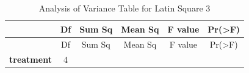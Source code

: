 \documentclass[]{article}
\begin{document}
\begin{longtable}[]{@{}cccccc@{}}
\caption{Analysis of Variance Table for Latin Square 3}\tabularnewline
\toprule
\begin{minipage}[b]{0.19\columnwidth}\centering\strut
~\strut
\end{minipage} & \begin{minipage}[b]{0.06\columnwidth}\centering\strut
Df\strut
\end{minipage} & \begin{minipage}[b]{0.10\columnwidth}\centering\strut
Sum Sq\strut
\end{minipage} & \begin{minipage}[b]{0.12\columnwidth}\centering\strut
Mean Sq\strut
\end{minipage} & \begin{minipage}[b]{0.12\columnwidth}\centering\strut
F value\strut
\end{minipage} & \begin{minipage}[b]{0.12\columnwidth}\centering\strut
Pr(\textgreater{}F)\strut
\end{minipage}\tabularnewline
\midrule
\endfirsthead
\toprule
\begin{minipage}[b]{0.19\columnwidth}\centering\strut
~\strut
\end{minipage} & \begin{minipage}[b]{0.06\columnwidth}\centering\strut
Df\strut
\end{minipage} & \begin{minipage}[b]{0.10\columnwidth}\centering\strut
Sum Sq\strut
\end{minipage} & \begin{minipage}[b]{0.12\columnwidth}\centering\strut
Mean Sq\strut
\end{minipage} & \begin{minipage}[b]{0.12\columnwidth}\centering\strut
F value\strut
\end{minipage} & \begin{minipage}[b]{0.12\columnwidth}\centering\strut
Pr(\textgreater{}F)\strut
\end{minipage}\tabularnewline
\midrule
\endhead
\begin{minipage}[t]{0.19\columnwidth}\centering\strut
\textbf{treatment}\strut
\end{minipage} & \begin{minipage}[t]{0.06\columnwidth}\centering\strut
4\strut
\end{minipage} & \begin{minipage}[t]{0.10\columnwidth}\centering\strut

\end{minipage}
\end{longtable}
\end{document}

